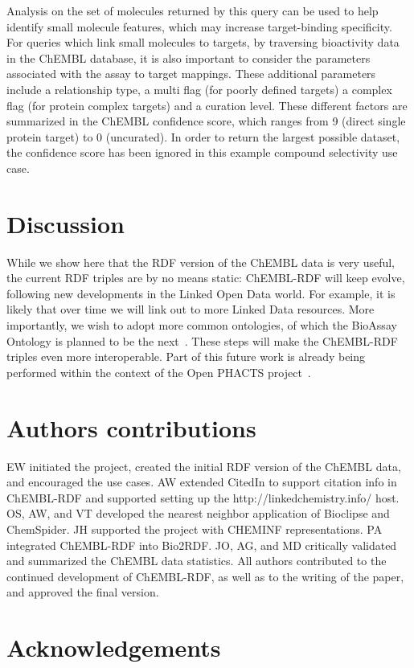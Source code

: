 \documentclass[10pt]{bmc_article}
\newenvironment{bmcformat}{\begin{raggedright}\baselineskip20pt\sloppy\setboolean{publ}{false}}{\end{raggedright}\baselineskip20pt\sloppy}
\begin{document}
\begin{bmcformat}
Analysis on the set of molecules returned by this query can be used to help identify small 
molecule features, which may increase target-binding specificity. For queries which link 
small molecules to targets, by traversing bioactivity data in the ChEMBL database, it is 
also important to consider the parameters associated with the assay to target mappings. 
These additional parameters include a relationship type, a multi flag (for poorly defined
targets) a complex flag (for protein complex targets) and a curation level. These different 
factors are summarized in the ChEMBL confidence score, which ranges from 9 (direct single 
protein target) to 0 (uncurated). In order to return the largest possible dataset, the 
confidence score has been ignored in this example compound selectivity use case.

\section*{Discussion}

While we show here that the RDF version of the ChEMBL data is very useful, the current RDF triples are by no means static: ChEMBL-RDF
will keep evolve, following new developments in the Linked Open Data world. For example, it is likely that over time we will link out
to more Linked Data resources. More importantly, we wish to adopt more common ontologies, of which the BioAssay Ontology is planned
to be the next~\cite{Visser2011}. These steps will make the ChEMBL-RDF triples even more interoperable. Part of this future work
is already being performed within the context of the Open PHACTS project~\cite{Williams2012}.

\section*{Authors contributions}
EW initiated the project, created the initial RDF version of the ChEMBL data, and encouraged the use cases.
AW extended CitedIn to support citation info in ChEMBL-RDF and supported setting up the http://linkedchemistry.info/ host.
OS, AW, and VT developed the nearest neighbor application of Bioclipse and ChemSpider.
JH supported the project with CHEMINF representations.
PA integrated ChEMBL-RDF into Bio2RDF.
JO, AG, and MD critically validated and summarized the ChEMBL data statistics.
All authors contributed to the continued development of ChEMBL-RDF, as well as to the writing of the paper,
and approved the final version.

\section*{Acknowledgements}


\end{bmcformat}
\end{document}
